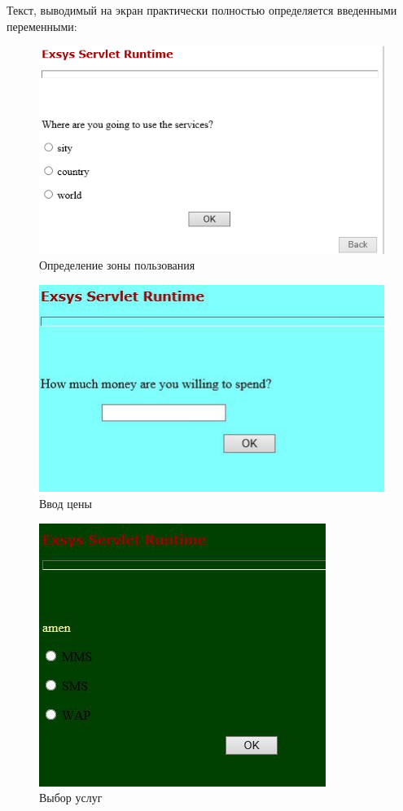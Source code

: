 \documentclass[14pt,a4paper,report]{report}
\begin{document}
Текст, выводимый на экран практически полностью определяется введенными переменными:

\begin{figure}[h!]
	\centering
	\includegraphics[scale = 0.85]{images/2.png}
	\caption{Определение зоны пользования}
\end{figure}


\begin{figure}[h!]
	\includegraphics[width=.90\textwidth]{images/3.jpg}\hfill
	\caption{Ввод цены}
\end{figure}

\clearpage
\begin{figure}[h!]
	\centering
	\includegraphics[scale = 0.80]{images/4.jpg}
	\caption{Выбор услуг}
\end{figure}
\end{document}

